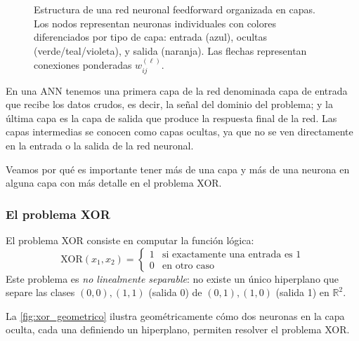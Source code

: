 \begin{figure}[h]
\caption[Estructura de una red neuronal en capas]{Estructura de una red neuronal feedforward organizada en capas. Los nodos representan neuronas individuales con colores diferenciados por tipo de capa: entrada (azul), ocultas (verde/teal/violeta), y salida (naranja). Las flechas representan conexiones ponderadas $w_{ij}^{(\ell)}$.}
\label{fig:neural_network}
\end{figure}

En una \gls{ANN} tenemos una primera capa de la red denominada capa de entrada que recibe los datos crudos, es decir, la señal del dominio del problema; y la última capa es la capa de salida que produce la respuesta final de la red. Las capas intermedias se conocen como capas ocultas, ya que no se ven directamente en la entrada o la salida de la red neuronal.

Veamos por qué es importante tener más de una capa y más de una neurona en alguna capa con más detalle en el problema XOR.

\subsubsection{El problema XOR}

El problema XOR consiste en computar la función lógica:
\[
\text{XOR}(x_1, x_2) = \begin{cases}
1 & \text{si exactamente una entrada es 1} \\
0 & \text{en otro caso}
\end{cases}
\]
Este problema es \textit{no linealmente separable}: no existe un único hiperplano que separe las clases $(0,0), (1,1)$ (salida 0) de $(0,1), (1,0)$ (salida 1) en $\mathbb{R}^2$.

La \autoref{fig:xor_geometrico} ilustra geométricamente cómo dos neuronas en la capa oculta, cada una definiendo un hiperplano, permiten resolver el problema XOR.

